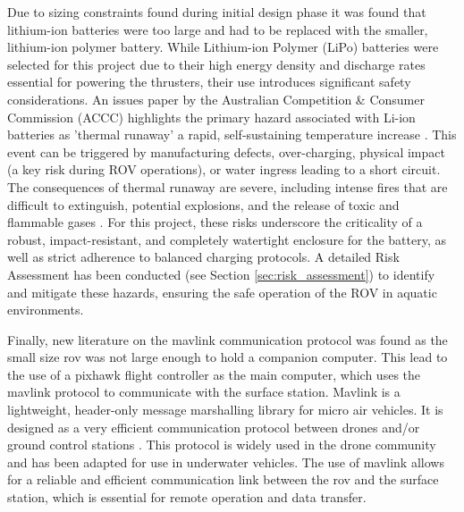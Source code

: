 \documentclass[11pt, a4paper]{article}
\begin{document}
Due to sizing constraints found during initial design phase it was found that lithium-ion batteries were too large and had to be replaced with the smaller, lithium-ion polymer battery.
While Lithium-ion Polymer (LiPo) batteries were selected for this project due to their high energy density and discharge rates essential for powering the thrusters, their use introduces significant safety considerations. An issues paper by the Australian Competition \& Consumer Commission (ACCC) highlights the primary hazard associated with Li-ion batteries as 'thermal runaway' a rapid, self-sustaining temperature increase \cite{ACCC2022LiIon}. This event can be triggered by manufacturing defects, over-charging, physical impact (a key risk during ROV operations), or water ingress leading to a short circuit. The consequences of thermal runaway are severe, including intense fires that are difficult to extinguish, potential explosions, and the release of toxic and flammable gases \cite{ACCC2022LiIon}. For this project, these risks underscore the criticality of a robust, impact-resistant, and completely watertight enclosure for the battery, as well as strict adherence to balanced charging protocols. A detailed Risk Assessment has been conducted (see Section \ref{sec:risk_assessment}) to identify and mitigate these hazards, ensuring the safe operation of the ROV in aquatic environments.

Finally, new literature on the mavlink communication protocol was found as the small size rov was not large enough to hold a companion computer. This lead to the use of a pixhawk flight controller as the main computer, which uses the mavlink protocol to communicate with the surface station. Mavlink is a lightweight, header-only message marshalling library for micro air vehicles. It is designed as a very efficient communication protocol between drones and/or ground control stations \cite{mavlink_2009_introduction}. This protocol is widely used in the drone community and has been adapted for use in underwater vehicles. The use of mavlink allows for a reliable and efficient communication link between the rov and the surface station, which is essential for remote operation and data transfer.
\end{document}
